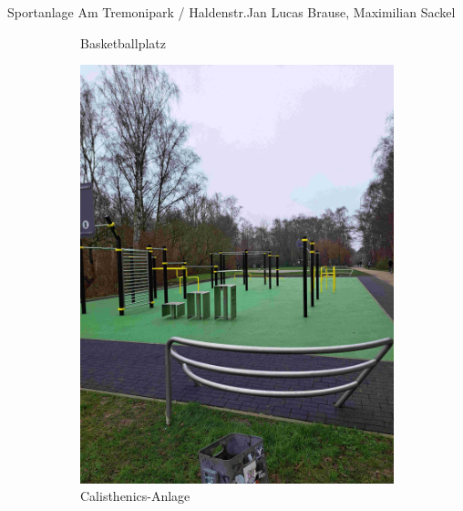 \documentclass{../../templates/amendment}
\begin{document}
\begin{boxed}{Sportanlage Am Tremonipark / Haldenstr.}{Jan Lucas Brause, Maximilian Sackel}
\begin{figure}[htpb]
\begin{subfigure}[]{0.32\textwidth}
\begin{center}
                \caption{Basketballplatz}%
            \end{center}
        \end{subfigure}
        \begin{subfigure}[]{0.32\textwidth}
            \begin{center}
                \includegraphics[width=\linewidth]{pictures/photo3.jpg}
                \caption{Calisthenics-Anlage}%
            \end{center}
        \end{subfigure}
        \begin{subfigure}[]{0.32\textwidth}
            \begin{center}

\end{center}
\end{subfigure}
\end{figure}
\end{boxed}
\end{document}
